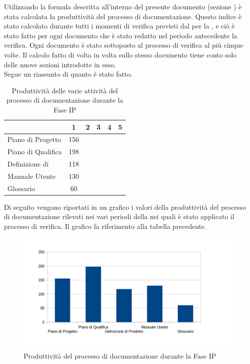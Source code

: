 	Utilizzando la formula descritta all'interno del presente documento (sezione ) è stata calcolata la produttività del processo di documentazione. Questo indice è stato calcolato durante tutti i momenti di verifica previsti dal  per la , e ciò è stato fatto per ogni documento che è stato redatto nel periodo antecedente la verifica. Ogni documento è stato sottoposto al processo di verifica al più cinque volte. Il calcolo fatto di volta in volta sullo stesso documento tiene conto solo delle nuove sezioni introdotte in esso.\\
	Segue un riassunto di quanto è stato fatto.
	\begin{table}[H]
		  \centering
			\begin{tabu}{| l | c | c | c | c | c |}
			\hline
			&1	&2	&3	&4	&5	\\ \hline
			Piano di Progetto	& 156 &	&	&	& \\ \hline
			Piano di Qualifica	& 198	&	&	&	&\\ \hline
			Definizione di  & 118 &	 	&	&  	&\\ \hline
			Manuale Utente & 130	&	&	&	& \\ \hline
			Glossario & 60 &  & & &\\ \hline
			\end{tabu}
			\caption{Produttività delle varie attività del processo di documentazione durante la Fase IP}
	\end{table}
	Di seguito vengono riportati in un grafico i valori della produttività del processo di documentazione rilevati nei vari periodi della  nei quali è stato applicato il processo di verifica. Il grafico fa riferimento alla tabella precedente.\\
	\begin{figure}[H]
		\centering
			\includegraphics[width=12cm]{PianoDiQualifica/Pics/ProduttivitaDocumentazioneFaseIP.pdf}
		\caption{Produttività del processo di documentazione durante la Fase IP}
	\end{figure}

